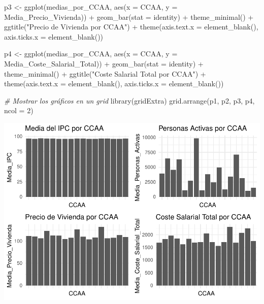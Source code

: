 \documentclass[
]{article}
\newenvironment{Shaded}{\begin{snugshade}}{\end{snugshade}}
\newcommand{\AttributeTok}[1]{\textcolor[rgb]{0.77,0.63,0.00}{#1}}
\newcommand{\CommentTok}[1]{\textcolor[rgb]{0.56,0.35,0.01}{\textit{#1}}}
\newcommand{\DecValTok}[1]{\textcolor[rgb]{0.00,0.00,0.81}{#1}}
\newcommand{\FunctionTok}[1]{\textcolor[rgb]{0.00,0.00,0.00}{#1}}
\newcommand{\NormalTok}[1]{#1}
\newcommand{\OtherTok}[1]{\textcolor[rgb]{0.56,0.35,0.01}{#1}}
\newcommand{\SpecialCharTok}[1]{\textcolor[rgb]{0.00,0.00,0.00}{#1}}
\newcommand{\StringTok}[1]{\textcolor[rgb]{0.31,0.60,0.02}{#1}}
\begin{document}
\begin{Shaded}
\begin{Highlighting}[]
\NormalTok{p3 }\OtherTok{\textless{}{-}} \FunctionTok{ggplot}\NormalTok{(medias\_por\_CCAA, }\FunctionTok{aes}\NormalTok{(}\AttributeTok{x =}\NormalTok{ CCAA, }\AttributeTok{y =}\NormalTok{ Media\_Precio\_Vivienda)) }\SpecialCharTok{+}
  \FunctionTok{geom\_bar}\NormalTok{(}\AttributeTok{stat =} \StringTok{\textquotesingle{}identity\textquotesingle{}}\NormalTok{) }\SpecialCharTok{+}
  \FunctionTok{theme\_minimal}\NormalTok{() }\SpecialCharTok{+}
  \FunctionTok{ggtitle}\NormalTok{(}\StringTok{"Precio de Vivienda por CCAA"}\NormalTok{) }\SpecialCharTok{+}
  \FunctionTok{theme}\NormalTok{(}\AttributeTok{axis.text.x =} \FunctionTok{element\_blank}\NormalTok{(), }
        \AttributeTok{axis.ticks.x =} \FunctionTok{element\_blank}\NormalTok{())}

\NormalTok{p4 }\OtherTok{\textless{}{-}} \FunctionTok{ggplot}\NormalTok{(medias\_por\_CCAA, }\FunctionTok{aes}\NormalTok{(}\AttributeTok{x =}\NormalTok{ CCAA, }\AttributeTok{y =}\NormalTok{ Media\_Coste\_Salarial\_Total)) }\SpecialCharTok{+}
  \FunctionTok{geom\_bar}\NormalTok{(}\AttributeTok{stat =} \StringTok{\textquotesingle{}identity\textquotesingle{}}\NormalTok{) }\SpecialCharTok{+}
  \FunctionTok{theme\_minimal}\NormalTok{() }\SpecialCharTok{+}
  \FunctionTok{ggtitle}\NormalTok{(}\StringTok{"Coste Salarial Total por CCAA"}\NormalTok{) }\SpecialCharTok{+}
  \FunctionTok{theme}\NormalTok{(}\AttributeTok{axis.text.x =} \FunctionTok{element\_blank}\NormalTok{(), }
        \AttributeTok{axis.ticks.x =} \FunctionTok{element\_blank}\NormalTok{())}

\CommentTok{\# Mostrar los gráficos en un grid}
\FunctionTok{library}\NormalTok{(gridExtra)}
\FunctionTok{grid.arrange}\NormalTok{(p1, p2, p3, p4, }\AttributeTok{ncol =} \DecValTok{2}\NormalTok{)}
\end{Highlighting}
\end{Shaded}

\includegraphics{trabajo_files/figure-latex/unnamed-chunk-5-1.pdf}
\end{document}
